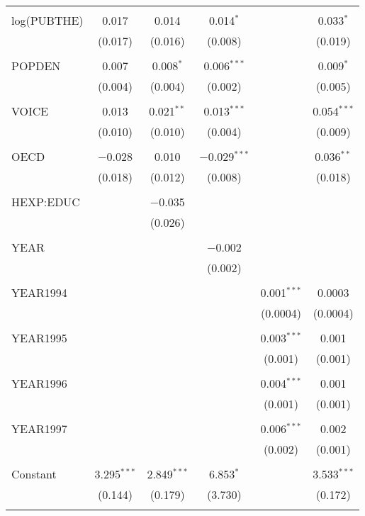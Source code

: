 \documentclass[12pt,a4paper]{article}\usepackage[]{graphicx}\usepackage[]{color}
\begin{document}
\begin{table}[!htbp]
\begin{tabular}{@{\extracolsep{5pt}}lccccc}
  & & & & & \\ 
 log(PUBTHE) & 0.017 & 0.014 & 0.014$^{*}$ &  & 0.033$^{*}$ \\ 
  & (0.017) & (0.016) & (0.008) &  & (0.019) \\ 
  & & & & & \\ 
 POPDEN & 0.007 & 0.008$^{*}$ & 0.006$^{***}$ &  & 0.009$^{*}$ \\ 
  & (0.004) & (0.004) & (0.002) &  & (0.005) \\ 
  & & & & & \\ 
 VOICE & 0.013 & 0.021$^{**}$ & 0.013$^{***}$ &  & 0.054$^{***}$ \\ 
  & (0.010) & (0.010) & (0.004) &  & (0.009) \\ 
  & & & & & \\ 
 OECD & $-$0.028 & 0.010 & $-$0.029$^{***}$ &  & 0.036$^{**}$ \\ 
  & (0.018) & (0.012) & (0.008) &  & (0.018) \\ 
  & & & & & \\ 
 HEXP:EDUC &  & $-$0.035 &  &  &  \\ 
  &  & (0.026) &  &  &  \\ 
  & & & & & \\ 
 YEAR &  &  & $-$0.002 &  &  \\ 
  &  &  & (0.002) &  &  \\ 
  & & & & & \\ 
 YEAR1994 &  &  &  & 0.001$^{***}$ & 0.0003 \\ 
  &  &  &  & (0.0004) & (0.0004) \\ 
  & & & & & \\ 
 YEAR1995 &  &  &  & 0.003$^{***}$ & 0.001 \\ 
  &  &  &  & (0.001) & (0.001) \\ 
  & & & & & \\ 
 YEAR1996 &  &  &  & 0.004$^{***}$ & 0.001 \\ 
  &  &  &  & (0.001) & (0.001) \\ 
  & & & & & \\ 
 YEAR1997 &  &  &  & 0.006$^{***}$ & 0.002 \\ 
  &  &  &  & (0.002) & (0.001) \\ 
  & & & & & \\ 
 Constant & 3.295$^{***}$ & 2.849$^{***}$ & 6.853$^{*}$ &  & 3.533$^{***}$ \\ 
  & (0.144) & (0.179) & (3.730) &  & (0.172) \\ 
  & & & & & \\ 

\end{tabular}
\end{table}
\end{document}
